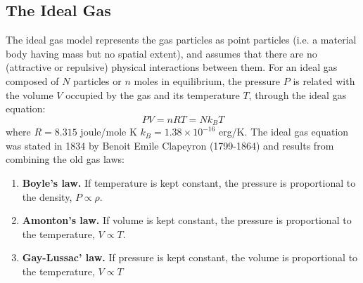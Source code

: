 \documentclass[../../../Main.tex]{subfiles}
\begin{document}
\subsection*{The Ideal Gas} 
The ideal gas model represents the gas particles as point particles (i.e. a material body having mass but no spatial extent), and assumes that there are no (attractive or repulsive) physical interactions between them. For an ideal gas composed of $N$ particles or $n$ moles in equilibrium, the pressure $P$ is related with the volume $V$ occupied by the gas and its temperature $T$, through the ideal gas equation:
\begin{equation*}
    P V = n RT = N k_B T
\end{equation*}
where $R=8.315$ joule/mole K $k_B = 1.38 \times 10^{-16}$ erg/K. The ideal gas equation was stated in 1834 by Benoit Emile Clapeyron (1799-1864) and results from combining the old gas laws: 
\begin{enumerate}
    \item \textbf{Boyle's law.} If temperature is kept constant, the pressure is proportional to the density, $P\propto \rho$. 
    \item \textbf{Amonton's law.} If volume is kept constant, the pressure is proportional to the temperature, $V\propto T$.
    \item \textbf{Gay-Lussac' law.} If pressure is kept constant, the volume is proportional to the temperature, $V\propto T$
\end{enumerate}
\end{document}
